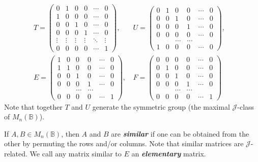 \documentclass[11pt]{article}
\newcommand{\defn}[1]{\textbf{\textit{#1}}}
\numberwithin{equation}{section}
\newcommand{\B}{\mathbb{B}}
\newcommand{\Bn}{M_n(\B)}
\newcommand{\J}{\mathscr{J}}
\begin{document}
\begin{align*}
  T = \begin{pmatrix}
    0 & 1 & 0 & 0 & \cdots & 0 \\
    1 & 0 & 0 & 0 & \cdots & 0 \\
    0 & 0 & 1 & 0 & \cdots & 0 \\
    0 & 0 & 0 & 1 & \cdots & 0 \\
    \vdots  & \vdots & \vdots & \vdots & \ddots & \vdots\\
    0 & 0 & 0 & 0 & \cdots & 1 
  \end{pmatrix}\text{, }&
  U = \begin{pmatrix}
    0 & 1 & 0 & 0 & \cdots & 0 \\
    0 & 0 & 1 & 0 & \cdots & 0 \\
    0 & 0 & 0 & 1 & \cdots & 0 \\
    0 & 0 & 0 & 0 & \cdots & 0 \\
      &   &   \dots & \dots & \\
    1 & 0 & 0 & 0 & \cdots & 0 
  \end{pmatrix},&\\
  E = \begin{pmatrix}
    1 & 0 & 0 & 0 & \cdots & 0 \\
    1 & 1 & 0 & 0 & \cdots & 0 \\
    0 & 0 & 1 & 0 & \cdots & 0 \\
    0 & 0 & 0 & 1 & \cdots & 0 \\
      &   &   \dots & \dots & \\
    0 & 0 & 0 & 0 & \cdots & 1 
  \end{pmatrix}\text{, }&
  F = \begin{pmatrix}
    0 & 0 & 0 & 0 & \cdots & 0 \\
    0 & 1 & 0 & 0 & \cdots & 0 \\
    0 & 0 & 1 & 0 & \cdots & 0 \\
    0 & 0 & 0 & 1 & \cdots & 0 \\
      &   &   \dots & \dots & \\
    0 & 0 & 0 & 0 & \cdots & 1
  \end{pmatrix}
\end{align*}
Note that together $T$ and $U$ generate the symmetric group (the maximal
$\J$-class of $\Bn$). 

If $A, B\in \Bn$, then $A$ and $B$ are \defn{similar} if 
one can be obtained from the other by permuting the rows and/or columns. Note
that similar matrices are $\J$-related.
We call any matrix similar to $E$ an \defn{elementary} matrix.
\end{document}
